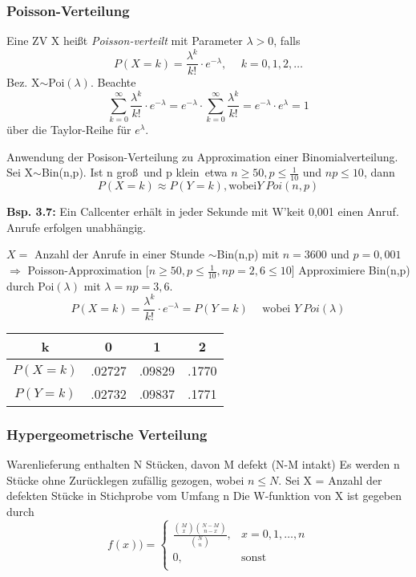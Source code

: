 \documentclass[a4paper,11pt]{article}
\begin{document}
\subsubsection{Poisson-Verteilung}
Eine ZV X heißt \textit{Poisson-verteilt} mit Parameter $\lambda >0$, falls
\[P(X=k)=\frac{\lambda^k}{k!}\cdot e^{-\lambda}, \hspace{15pt} k=0,1,2,\dots\]
Bez. X$\sim$Poi$(\lambda)$.
\newline Beachte
\[\sum_{k=0}^{\infty}\frac{\lambda^k}{k!}\cdot e^{-\lambda} = e^{-\lambda}\cdot \sum_{k=0}^{\infty}\frac{\lambda^k}{k!} = e^{-\lambda}\cdot e^\lambda = 1\]
über die Taylor-Reihe für $e^\lambda$.

\noindent Anwendung der Posison-Verteilung zu Approximation einer Binomialverteilung. 
\newline Sei X$\sim$Bin(n,p). Ist n \glqq groß\grqq\ und p \glqq klein\grqq\, etwa $n\geq50,p\leq\frac{1}{10}$ und $np\leq10$, dann
\[P(X=k)\approx P(Y=k), \text{wobei} Y~Poi(n,p)\]

\vspace{6pt}
\noindent\textbf{Bsp. 3.7:} 
Ein Callcenter erhält in jeder Sekunde mit W'keit 0,001 einen Anruf. 
Anrufe erfolgen unabhängig.

\noindent $X=$ Anzahl der Anrufe in einer Stunde
\newline $\sim$Bin(n,p) mit $n=3600$ und $p=0,001$
\newline $\Rightarrow$ Poisson-Approximation [$n\geq 50, p\leq\frac{1}{10}, np=2,6\leq10$]
\newline Approximiere Bin(n,p) durch Poi$(\lambda)$ mit $\lambda=np=3,6$.
\[P(X=k)=\frac{\lambda^k}{k!}\cdot e^{-\lambda}=P(Y=k) \hspace{15pt}\text{wobei } Y~Poi(\lambda)\]

\begin{center}
\begin{tabular}{c|c c c}
    k & 0 & 1 & 2 \\
    \hline
    $P(X=k)$ & .02727 & .09829 & .1770 \\
    $P(Y=k)$ & .02732 & .09837 & .1771 \\
\end{tabular}
\end{center}

\subsubsection{Hypergeometrische Verteilung}
Warenlieferung enthalten N Stücken, davon M defekt (N-M intakt)
\newline Es werden n Stücke ohne Zurücklegen zufällig gezogen, wobei $n\leq N$. Sei
\newline X = Anzahl der defekten Stücke in Stichprobe vom Umfang n
\newline Die W-funktion von X ist gegeben durch 
\begin{equation*}
f(x))= \begin{cases}
\frac{\binom{M}{x}\binom{N-M}{n-x}}{\binom{N}{n}}, & x=0,1,\dots,n\\
0, & \text{sonst}\\
\end{cases}
\end{equation*} 
\end{document}
